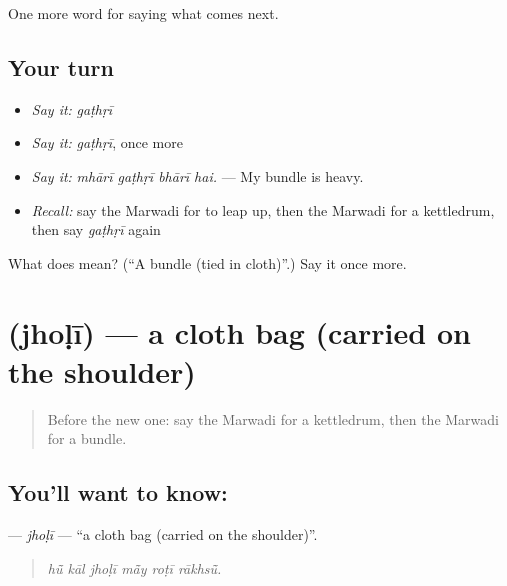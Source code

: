 \begin{grammarlens}[title={What you've built}]
One more word for saying what comes next.
\end{grammarlens}

\subsection*{Your turn}
\begin{itemize}
\raggedright
  \item \emph{Say it:} \emph{gaṭhṛī}
  \item \emph{Say it:} \emph{gaṭhṛī}, once more
  \item \emph{Say it:} \emph{mhārī gaṭhṛī bhārī hai.} — My bundle is heavy.
  \item \emph{Recall:} say the Marwadi for to leap up, then the Marwadi for a kettledrum, then say \emph{gaṭhṛī} again
\end{itemize}

\begin{tcolorbox}[breakable,colback=teal!4,colframe=teal!35!black,title={Before you move on}]
What does  mean? (\textquotedblleft{}A bundle (tied in cloth)\textquotedblright{}.) Say it once more.
\end{tcolorbox}
\section[\texorpdfstring{\mw{झोळी} (jhoḷī)}{झोळी (jhoḷī)}]{ (jhoḷī) — a cloth bag (carried on the shoulder)}

\label{lesson:MW-C225-jholi}



\begin{quote}
Before the new one: say the Marwadi for a kettledrum, then the Marwadi for a bundle.
\end{quote}

\subsection*{You'll want to know: }
\textbf{} — \emph{jhoḷī} — \textquotedblleft{}a cloth bag (carried on the shoulder)\textquotedblright{}.

\begin{quote}
     
\end{quote}

\begin{quote}
\emph{hū̃ kāl jhoḷī mā̃y roṭī rākhsū̃.}
\end{quote}

